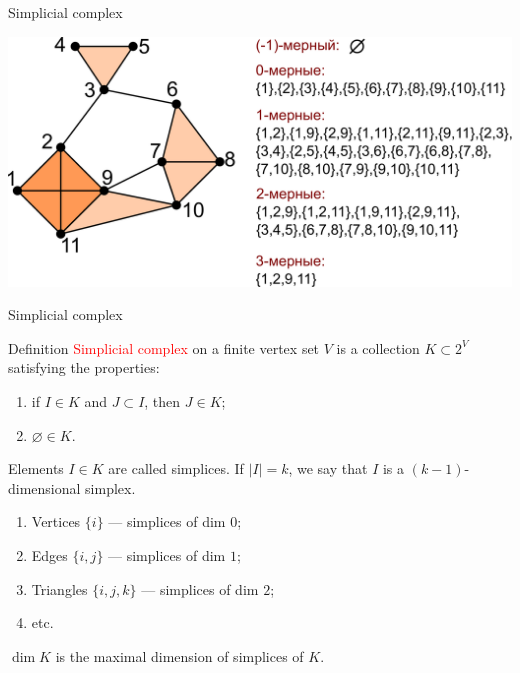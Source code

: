 \documentclass[10pt]{beamer}
\begin{document}
\begin{frame}{Simplicial complex}


\begin{center}
\includegraphics[scale=0.3]{pictures/simpcomp.pdf}
\end{center}

\end{frame}

\begin{frame}{Simplicial complex}

\begin{block}{Definition}
\textcolor{red}{Simplicial complex} on a finite vertex set $V$ is a collection $K\subset 2^V$ satisfying the properties:
\begin{enumerate}
\item if $I\in K$ and $J\subset I$, then $J\in K$;
\item $\varnothing\in K$. 
\end{enumerate}
Elements $I\in K$ are called simplices. If $|I|=k$, we say that $I$ is a $(k-1)$-dimensional simplex.
\end{block}

\begin{enumerate}
  \item Vertices $\{i\}$ --- simplices of dim $0$;
  \item Edges $\{i,j\}$ --- simplices of dim $1$;
  \item Triangles $\{i,j,k\}$ --- simplices of dim $2$;
  \item etc.
\end{enumerate}

$\dim K$ is the maximal dimension of simplices of $K$.

\end{frame}
\end{document}

